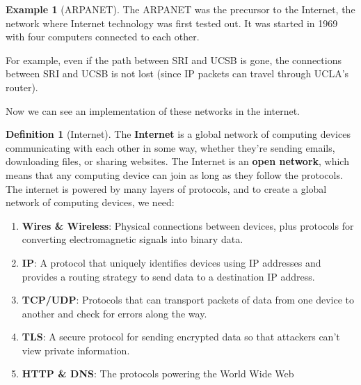 \documentclass{article}
\theoremstyle{definition}
\newtheorem{example}{Example}[section]
\newtheorem{definition}{Definition}[section]
\begin{document}
    \begin{example}[ARPANET]
      The ARPANET was the precursor to the Internet, the network where Internet technology was first tested out. It was started in 1969 with four computers connected to each other. 

        \begin{center}
        \end{center}

      For example, even if the path between SRI and UCSB is gone, the connections between SRI and UCSB is not lost (since IP packets can travel through UCLA's router). 
    \end{example}


    Now we can see an implementation of these networks in the internet. 

    \begin{definition}[Internet]
      The \textbf{Internet} is a global network of computing devices communicating with each other in some way, whether they're sending emails, downloading files, or sharing websites. The Internet is an \textbf{open network}, which means that any computing device can join as long as they follow the protocols. The internet is powered by many layers of protocols, and to create a global network of computing devices, we need: 

      \begin{enumerate}
        \item \textbf{Wires \& Wireless}: Physical connections between devices, plus protocols for converting electromagnetic signals into binary data. 
        \item \textbf{IP}: A protocol that uniquely identifies devices using IP addresses and provides a routing strategy to send data to a destination IP address. 
        \item \textbf{TCP/UDP}: Protocols that can transport packets of data from one device to another and check for errors along the way. 
        \item \textbf{TLS}: A secure protocol for sending encrypted data so that attackers can't view private information. 
        \item \textbf{HTTP \& DNS}: The protocols powering the World Wide Web
      \end{enumerate}        
    \end{definition}
\end{document}
